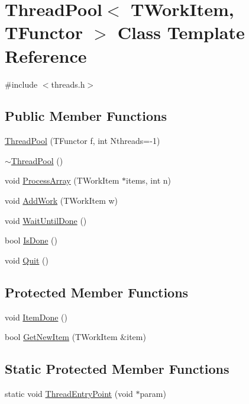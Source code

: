 \hypertarget{class_thread_pool}{}\section{Thread\+Pool$<$ T\+Work\+Item, T\+Functor $>$ Class Template Reference}
\label{class_thread_pool}


{\ttfamily \#include $<$threads.\+h$>$}

\subsection*{Public Member Functions}
\begin{DoxyCompactItemize}
\item 
\hyperlink{class_thread_pool_a4bf2c70dcc87ba357f2027946646c07c}{Thread\+Pool} (T\+Functor f, int Nthreads=-\/1)
\item 
\hyperlink{class_thread_pool_a67d508c151b2248a01aee26ad3409fc2}{$\sim$\+Thread\+Pool} ()
\item 
void \hyperlink{class_thread_pool_aa690b8055c0183d5a058b22b5a62bb74}{Process\+Array} (T\+Work\+Item $\ast$items, int n)
\item 
void \hyperlink{class_thread_pool_aef1a04d9ec3eef39a43cc45f471611d7}{Add\+Work} (T\+Work\+Item w)
\item 
void \hyperlink{class_thread_pool_a12e588b81c0cf6bf93f4ac2f0c50b4e8}{Wait\+Until\+Done} ()
\item 
bool \hyperlink{class_thread_pool_aa77d821a3c6a448256da4fd61e6c8fb2}{Is\+Done} ()
\item 
void \hyperlink{class_thread_pool_a91bfc016ba30df063ef0b5e0f1448e02}{Quit} ()
\end{DoxyCompactItemize}
\subsection*{Protected Member Functions}
\begin{DoxyCompactItemize}
\item 
void \hyperlink{class_thread_pool_ac3ba2c63821d18d21f3face879fbf9a4}{Item\+Done} ()
\item 
bool \hyperlink{class_thread_pool_a3e9222d0af2a9b55bdb6102014ec28f3}{Get\+New\+Item} (T\+Work\+Item \&item)
\end{DoxyCompactItemize}
\subsection*{Static Protected Member Functions}
\begin{DoxyCompactItemize}
\item 
static void \hyperlink{class_thread_pool_a21a711c365a2fb1dcd34b7a2271512d6}{Thread\+Entry\+Point} (void $\ast$param)
\end{DoxyCompactItemize}
